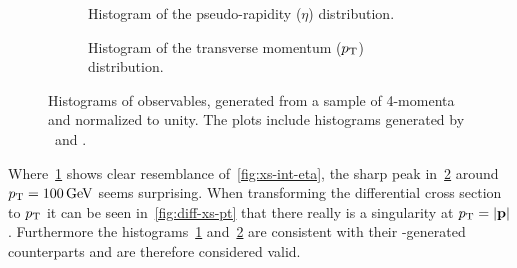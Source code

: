 \begin{figure}[p]
  \centering

  \begin{subfigure}[b]{\textwidth}
    \centering {}
    \caption{\label{fig:histeta} Histogram of the pseudo-rapidity
      (\(\eta\)) distribution.}
  \end{subfigure}
  \begin{subfigure}[b]{\textwidth}
    \centering {}
    \caption{\label{fig:histpt} Histogram of the transverse momentum
      (\(p_\mathrm{T}\)) distribution.}
  \end{subfigure}
  \caption{\label{fig:histos} Histograms of observables, generated
    from a sample of 4-momenta and normalized to unity. The plots
    include histograms generated by \sherpa\ and \rivet.}
\end{figure}

Where~\ref{fig:histeta} shows clear resemblance
of~\ref{fig:xs-int-eta}, the sharp peak in~\ref{fig:histpt} around
\(p_\mathrm{T}=\SI{100}{\giga\electronvolt}\) seems surprising. When
transforming the differential cross section to \(p_\mathrm{T}\) it can be seen
in~\ref{fig:diff-xs-pt} that there really is a singularity at
\(p_\mathrm{T} =\abs{\vb{p}}\). Furthermore the histograms~\ref{fig:histeta}
and~\ref{fig:histpt} are consistent with their \rivet-generated
counterparts and are therefore considered valid.
